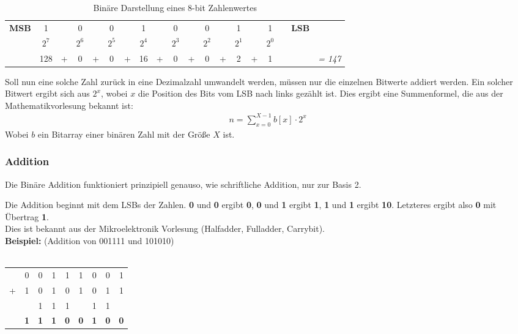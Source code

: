 \begin{table}[H]
	\begin{center}
		\begin{tabular}{ccccccccccccccccccc}
			\textbf{MSB\textit{}} & 1 && 0 && 0 && 1 && 0 && 0 && 1 && 1 && \textbf{LSB\textit{}}& \\
			    & $2^7$ && $2^6$ && $2^5$ && $2^4$ && $2^3$ && $2^2$ && $2^1$ && $2^0$ &&& \\
			    & 128 & + & 0 & + & 0 & + & 16 & + & 0 & + & 0 & + & 2 & + & 1 &&& \textit{= 147}
		\end{tabular}
		\caption{Binäre Darstellung eines 8-bit Zahlenwertes}
		\label{tab:8bitnumber}
	\end{center}
\end{table}

Soll nun eine solche Zahl zurück in eine Dezimalzahl umwandelt werden, müssen nur die einzelnen Bitwerte addiert werden. Ein solcher Bitwert ergibt sich aus $2^x$, wobei $x$ die Position des Bits vom LSB nach links gezählt ist. Dies ergibt eine Summenformel, die aus der Mathematikvorlesung bekannt ist:
\begin{align}
	n = \sum_{x=0}^{X-1}b[x] \cdot 2^x
\end{align}
Wobei $b$ ein Bitarray einer binären Zahl mit der Größe $X$ ist.

\subsubsection{Addition}
Die Binäre Addition funktioniert prinzipiell genauso, wie schriftliche Addition, nur zur Basis 2.

Die Addition beginnt mit dem LSBs der Zahlen. \textbf{0} und \textbf{0} ergibt \textbf{0}, \textbf{0} und \textbf{1} ergibt \textbf{1}, \textbf{1} und \textbf{1} ergibt \textbf{10}. Letzteres ergibt also \textbf{0} mit Übertrag \textbf{1}. \\
Dies ist bekannt aus der Mikroelektronik Vorlesung (Halfadder, Fulladder, Carrybit).\\

\textbf{Beispiel:} (Addition von 001111 und 101010)\\ \\
\begin{tabular}{ccccccccc}
	 &0&0&1&1&1&0&0&1\\
	+&1&0&1&0&1&0&1&1\\
	\hline
	&&\scriptsize{1}&\scriptsize{1}&\scriptsize{1}&&\scriptsize{1}&\scriptsize{1}& \\
	\hline
	&\textbf{1}&\textbf{1}&\textbf{1}&\textbf{0}&\textbf{0}&\textbf{1}&\textbf{0}&\textbf{0}
\end{tabular}

